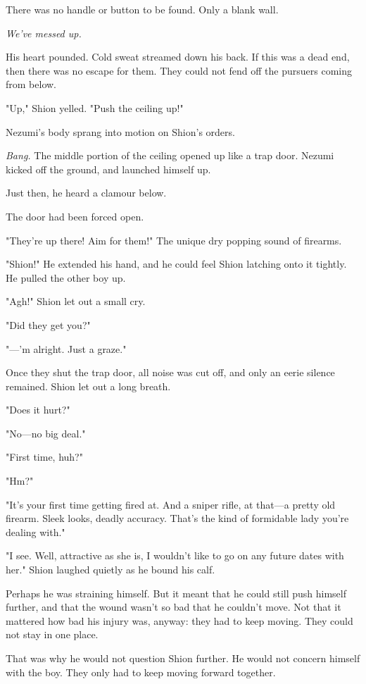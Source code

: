 There was no handle or button to be found. Only a blank wall.

\emph{We've messed up.}

His heart pounded. Cold sweat streamed down his back. If this was a dead
end, then there was no escape for them. They could not fend off the
pursuers coming from below.

"Up," Shion yelled. "Push the ceiling up!"

Nezumi's body sprang into motion on Shion's orders.

\emph{Bang.} The middle portion of the ceiling opened up like a trap door.
Nezumi kicked off the ground, and launched himself up.

Just then, he heard a clamour below.

The door had been forced open.

"They're up there! Aim for them!" The unique dry popping sound of
firearms.

"Shion!" He extended his hand, and he could feel Shion latching onto it
tightly. He pulled the other boy up.

"Agh!" Shion let out a small cry.

"Did they get you?"

"---'m alright. Just a graze."

Once they shut the trap door, all noise was cut off, and only an eerie
silence remained. Shion let out a long breath.

"Does it hurt?"

"No---no big deal."

"First time, huh?"

"Hm?"

"It's your first time getting fired at. And a sniper rifle, at that---a
pretty old firearm. Sleek looks, deadly accuracy. That's the kind of
formidable lady you're dealing with."

"I see. Well, attractive as she is, I wouldn't like to go on any future
dates with her." Shion laughed quietly as he bound his calf.

Perhaps he was straining himself. But it meant that he could still push
himself further, and that the wound wasn't so bad that he couldn't move.
Not that it mattered how bad his injury was, anyway: they had to keep
moving. They could not stay in one place.

That was why he would not question Shion further. He would not concern
himself with the boy. They only had to keep moving forward together.

